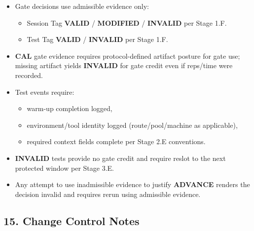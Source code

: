 \documentclass[10pt]{article}
\begin{document}
\begin{landscape}
\begin{itemize}
\item Gate decisions use admissible evidence only:
  \begin{itemize}
  \item Session Tag \textbf{VALID} / \textbf{MODIFIED} / \textbf{INVALID} per Stage 1.F.
  \item Test Tag \textbf{VALID} / \textbf{INVALID} per Stage 1.F.
  \end{itemize}
\item \textbf{CAL} gate evidence requires protocol-defined artifact posture for gate use; missing artifact yields \textbf{INVALID} for gate credit even if reps/time were recorded.
\item Test events require:
  \begin{itemize}
  \item warm-up completion logged,
  \item environment/tool identity logged (route/pool/machine as applicable),
  \item required context fields complete per Stage 2.E conventions.
  \end{itemize}
\item \textbf{INVALID} tests provide no gate credit and require reslot to the next protected window per Stage 3.E.
\item Any attempt to use inadmissible evidence to justify \textbf{ADVANCE} renders the decision invalid and requires rerun using admissible evidence.
\end{itemize}

\end{landscape}

\subsection*{15. Change Control Notes}
\end{document}
